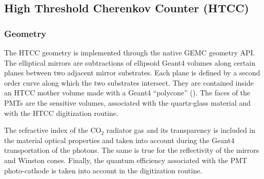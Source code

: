\subsection{High Threshold Cherenkov Counter (HTCC)}

\subsubsection{Geometry}

The HTCC geometry is implemented through the native GEMC geometry API. The elliptical mirrors are subtractions of
ellipsoid Geant4 volumes along certain planes between two adjacent mirror substrates. Each plane is defined by a second order
curve along which the two substrates intersect.
They are contained inside an HTCC mother volume made with a Geant4 ``polycone'' ().
The faces of the PMTs are the sensitive volumes, associated with the quartz-glass material and with the HTCC digitization routine.

The refractive index of the CO$_2$ radiator gas and its transparency is included in the material optical properties and taken
into account during the Geant4 transportation of the photons. The same is true for the reflectivity of the mirrors and Winston cones.
Finally, the quantum efficiency associated with the PMT photo-cathode is taken into account in
the digitization routine.


